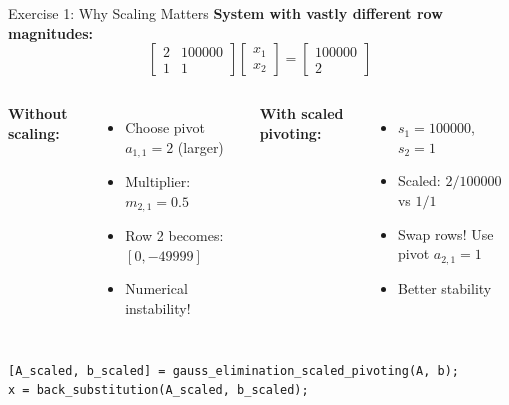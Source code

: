 \documentclass[aspectratio=169]{beamer}
\begin{document}
\begin{frame}[fragile]{Exercise 1: Why Scaling Matters}
	\textbf{System with vastly different row magnitudes:}
	\begin{equation*}
		\begin{bmatrix}
			2 & 100000 \\
			1 & 1
		\end{bmatrix}
		\begin{bmatrix}
			x_1 \\ x_2
		\end{bmatrix}
		=
		\begin{bmatrix}
			100000 \\ 2
		\end{bmatrix}
	\end{equation*}

	\begin{columns}
		\textbf{Without scaling:}
		\begin{itemize}
			\item Choose pivot $a_{1,1} = 2$ (larger)
			\item Multiplier: $m_{2,1} = 0.5$
			\item Row 2 becomes: $[0, -49999]$
			\item \alert{Numerical instability!}
		\end{itemize}

		\textbf{With scaled pivoting:}
		\begin{itemize}
			\item $s_1 = 100000$, $s_2 = 1$
			\item Scaled: $2/100000$ vs $1/1$
			\item Swap rows! Use pivot $a_{2,1} = 1$
			\item \alert{Better stability}
		\end{itemize}
	\end{columns}

	\vspace{0.3cm}
	\begin{verbatim}
[A_scaled, b_scaled] = gauss_elimination_scaled_pivoting(A, b);
x = back_substitution(A_scaled, b_scaled);
    \end{verbatim}
\end{frame}
\end{document}
